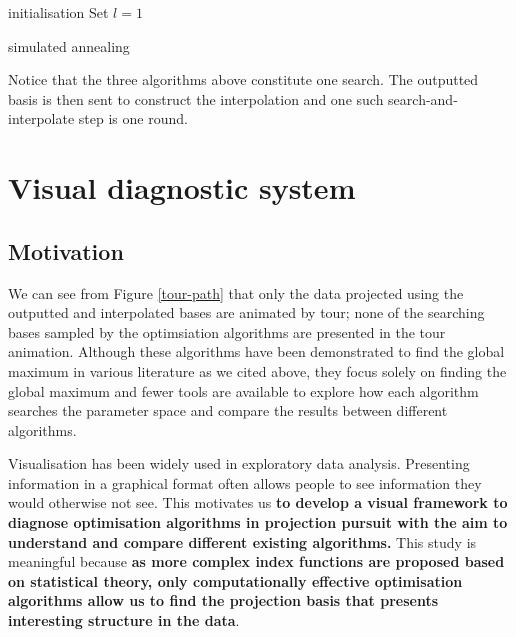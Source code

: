 \documentclass[12pt]{article}
\begin{document}
\begin{algorithm}
\SetAlgoLined
{}
  initialisation\;
  Set $l = 1$\;
  \caption{simulated annealing}
  \label{simulated_annealing}
\end{algorithm}

Notice that the three algorithms above constitute one search. The
outputted basis is then sent to construct the interpolation and one such
search-and-interpolate step is one round.

\newpage

\hypertarget{vis-diag}{%
\section{Visual diagnostic system}\label{vis-diag}}

\hypertarget{motivation}{%
\subsection{Motivation}\label{motivation}}

We can see from Figure \ref{tour-path} that only the data projected
using the outputted and interpolated bases are animated by tour; none of
the searching bases sampled by the optimsiation algorithms are presented
in the tour animation. Although these algorithms have been demonstrated
to find the global maximum in various literature as we cited above, they
focus solely on finding the global maximum and fewer tools are available
to explore how each algorithm searches the parameter space and compare
the results between different algorithms.

Visualisation has been widely used in exploratory data analysis.
Presenting information in a graphical format often allows people to see
information they would otherwise not see. This motivates us \textbf{to
develop a visual framework to diagnose optimisation algorithms in
projection pursuit with the aim to understand and compare different
existing algorithms.} This study is meaningful because \textbf{as more
complex index functions are proposed based on statistical theory, only
computationally effective optimisation algorithms allow us to find the
projection basis that presents interesting structure in the data}.
\end{document}
